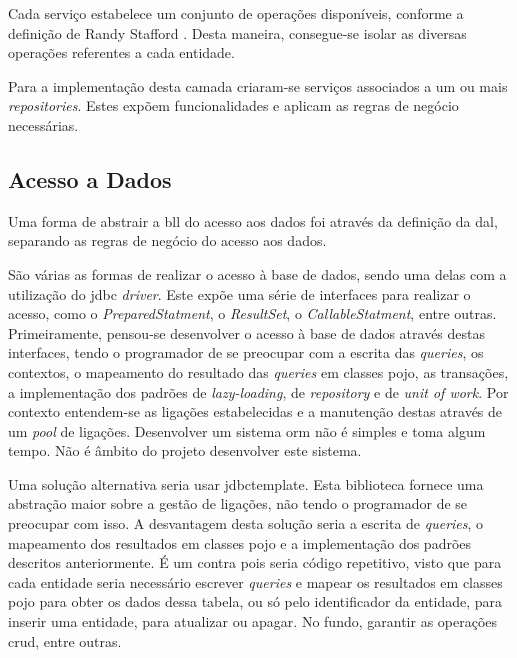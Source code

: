 Cada serviço estabelece um conjunto de operações disponíveis, conforme a definição de Randy Stafford \cite{PofEAASe2:serviceLayer}. Desta maneira, consegue-se isolar as diversas operações referentes a cada entidade. 

Para a implementação desta camada criaram-se serviços associados a um ou mais \textit{repositories}. Estes expõem funcionalidades e aplicam as regras de negócio necessárias.

%
%
\subsection{Acesso a Dados}\label{subsec331}

Uma forma de abstrair a \acrshort{bll} do acesso aos dados foi através da definição da \acrshort{dal}, separando as regras de negócio do acesso aos dados.

São várias as formas de realizar o acesso à base de dados, sendo uma delas com a utilização do \acrshort{jdbc} \textit{driver}. Este expõe uma série de interfaces para realizar o acesso, como o \textit{PreparedStatment}, o \textit{ResultSet}, o \textit{CallableStatment}, entre outras. Primeiramente, pensou-se desenvolver o acesso à base de dados através destas interfaces, tendo o programador de se preocupar com a escrita das \textit{queries}, os contextos, o mapeamento do resultado das \textit{queries} em classes \acrshort{pojo}, as transações, a implementação dos padrões de \textit{lazy-loading}, de \textit{repository} e de \textit{unit of work}. Por contexto entendem-se as ligações estabelecidas e a manutenção destas através de um \textit{pool} de ligações. Desenvolver um sistema \acrfull{orm} não é simples e toma algum tempo. Não é âmbito do projeto desenvolver este sistema. 

Uma solução alternativa seria usar \acrfull{jdbctemplate}. Esta biblioteca fornece uma abstração maior sobre a gestão de ligações, não tendo o programador de se preocupar com isso. A desvantagem desta solução seria a escrita de \textit{queries}, o mapeamento dos resultados em classes \acrshort{pojo} e a implementação dos padrões descritos anteriormente. É um contra pois seria código repetitivo, visto que para cada entidade seria necessário escrever \textit{queries} e mapear os resultados em classes \acrshort{pojo} para obter os dados dessa tabela, ou só pelo identificador da entidade, para inserir uma entidade, para atualizar ou apagar. No fundo, garantir as operações \acrfull{crud}, entre outras. 

